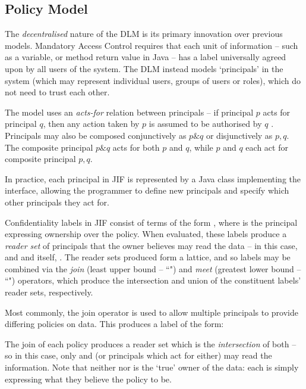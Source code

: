\subsection{Policy Model}

The \textit{decentralised} nature of the DLM is its primary innovation over previous models. Mandatory Access Control requires that each unit of information -- such as a variable, or method return value in Java -- has a label universally agreed upon by all users of the system. The DLM instead models `principals' in the system (which may represent individual users, groups of users or roles), which do not need to trust each other.

The model uses an \textit{acts-for} relation between principals -- if principal $ p $ acts for principal $ q $, then any action taken by $ p $ is assumed to be authorised by $ q $ \cite{myers2000dlm}. Principals may also be composed conjunctively as $ p \& q $ or disjunctively as $ p,q $. The composite principal $ p\&q $ acts for both $ p $ and $ q $, while $ p $ and $ q $ each act for composite principal $ p,q $.

In practice, each principal in JIF is represented by a Java class implementing the  interface, allowing the programmer to define new principals and specify which other principals they act for.

Confidentiality labels in JIF consist of terms of the form , where  is the principal expressing ownership over the policy. When evaluated, these labels produce a \textit{reader set} of principals that the owner believes may read the data -- in this case,  and  and itself, . The reader sets produced form a lattice, and so labels may be combined via the \textit{join} (least upper bound -- ``\mono{;}") and \textit{meet} (greatest lower bound -- ``") operators, which produce the intersection and union of the constituent labels' reader sets, respectively.

Most commonly, the join operator is used to allow multiple principals to provide differing policies on data. This produces a label of the form:


The join of each policy produces a reader set which is the \textit{intersection} of both -- so in this case, only  and  (or principals which act for either) may read the information. Note that neither  nor  is the `true' owner of the data: each is simply expressing what they believe the policy to be.

